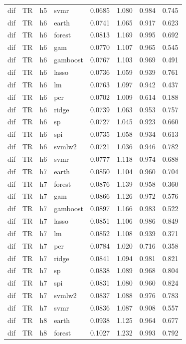 \begin{ThreePartTable}
\begin{longtable}[t]{llclcccc}
dif & TR & h5 & svmr & 0.0685 & 1.080 & 0.984 & 0.745\\
\addlinespace
dif & TR & h6 & earth & 0.0741 & 1.065 & 0.917 & 0.623\\
dif & TR & h6 & forest & 0.0813 & 1.169 & 0.995 & 0.692\\
dif & TR & h6 & gam & 0.0770 & 1.107 & 0.965 & 0.545\\
dif & TR & h6 & gamboost & 0.0767 & 1.103 & 0.969 & 0.491\\
dif & TR & h6 & lasso & 0.0736 & 1.059 & 0.939 & 0.761\\
dif & TR & h6 & lm & 0.0763 & 1.097 & 0.942 & 0.437\\
dif & TR & h6 & pcr & 0.0702 & 1.009 & 0.614 & 0.188\\
dif & TR & h6 & ridge & 0.0739 & 1.063 & 0.953 & 0.757\\
dif & TR & h6 & sp & 0.0727 & 1.045 & 0.923 & 0.660\\
dif & TR & h6 & spi & 0.0735 & 1.058 & 0.934 & 0.613\\
dif & TR & h6 & svmlw2 & 0.0721 & 1.036 & 0.946 & 0.782\\
dif & TR & h6 & svmr & 0.0777 & 1.118 & 0.974 & 0.688\\
\addlinespace
dif & TR & h7 & earth & 0.0850 & 1.104 & 0.960 & 0.704\\
dif & TR & h7 & forest & 0.0876 & 1.139 & 0.958 & 0.360\\
dif & TR & h7 & gam & 0.0866 & 1.126 & 0.972 & 0.576\\
dif & TR & h7 & gamboost & 0.0897 & 1.166 & 0.983 & 0.522\\
dif & TR & h7 & lasso & 0.0851 & 1.106 & 0.986 & 0.849\\
dif & TR & h7 & lm & 0.0852 & 1.108 & 0.939 & 0.371\\
dif & TR & h7 & pcr & 0.0784 & 1.020 & 0.716 & 0.358\\
dif & TR & h7 & ridge & 0.0841 & 1.094 & 0.981 & 0.821\\
dif & TR & h7 & sp & 0.0838 & 1.089 & 0.968 & 0.804\\
dif & TR & h7 & spi & 0.0831 & 1.080 & 0.960 & 0.824\\
dif & TR & h7 & svmlw2 & 0.0837 & 1.088 & 0.976 & 0.783\\
dif & TR & h7 & svmr & 0.0836 & 1.087 & 0.908 & 0.557\\
\addlinespace
dif & TR & h8 & earth & 0.0938 & 1.125 & 0.964 & 0.677\\
dif & TR & h8 & forest & 0.1027 & 1.232 & 0.993 & 0.792\\

\end{longtable}
\end{ThreePartTable}
